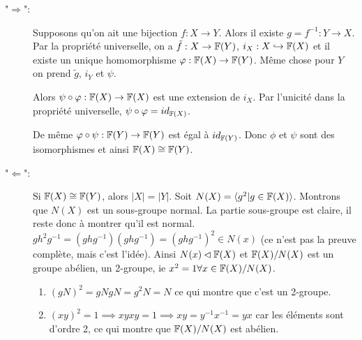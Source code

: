     \begin{preuve}
      \begin{description}
      \item["$\Rightarrow$":] Supposons qu'on ait une bijection $f: X \to Y$. Alors il existe $g = f^{-1}:Y
        \to X$. Par la propriété universelle, on a $\tilde{f}: X \to \mathbb{F}(Y)$, $i_X: X \hookrightarrow \mathbb{F}(X)$ et
        il existe un unique homomorphisme $\varphi: \mathbb{F}(X) \to \mathbb{F}(Y)$. Même chose pour $Y$ on prend $\tilde{g}$,
        $i_Y$ et $\psi$.

        \begin{center}
        \end{center}
        
        Alors $\psi \circ \varphi : \mathbb{F}(X) \to \mathbb{F}(X)$ est une extension de $i_X$. Par l'unicité dans la propriété
        universelle, $\psi \circ \varphi = id_{\mathbb{F}(X)}$.
        
        De même $\varphi \circ \psi: \mathbb{F}(Y) \to \mathbb{F}(Y)$ est égal à $id_{\mathbb{F}(Y)}$. Donc $\phi$ et $\psi$ sont des
        isomorphismes et ainsi $\mathbb{F}(X) \cong \mathbb{F}(Y)$.

      \item["$\Leftarrow$":] Si $\mathbb{F}(X) \cong \mathbb{F}(Y)$, alors $|X| = |Y|$. Soit $N(X) = \langle g^2 | g \in \mathbb{F}(X)
        \rangle$. Montrons que $N(X)$ est un sous-groupe normal. La partie sous-groupe est claire, il reste
        donc à montrer qu'il est normal. $gh^2g^{-1} = (ghg^{-1})(ghg^{-1}) = (ghg^{-1})^2 \in N(x)$ (ce n'est
        pas la preuve complète, mais c'est l'idée). Ainsi $N(x) \lhd \mathbb{F}(X)$ et $\mathbb{F}(X)/N(X)$ est un groupe
        abélien, un 2-groupe, ie $x^2 = 1 \forall x \in \mathbb{F}(X)/N(X)$.
        \begin{enumerate}
        \item $(gN)^2 = gNgN = g^2N = N$ ce qui montre que c'est un 2-groupe.
        \item $(xy)^2 = 1 \implies xyxy = 1 \implies xy = y^{-1}x^{-1} = yx$ car les éléments sont d'ordre 2, ce
          qui montre que $\mathbb{F}(X)/N(X)$ est abélien.
        \end{enumerate}
        

\end{description}
\end{preuve}
